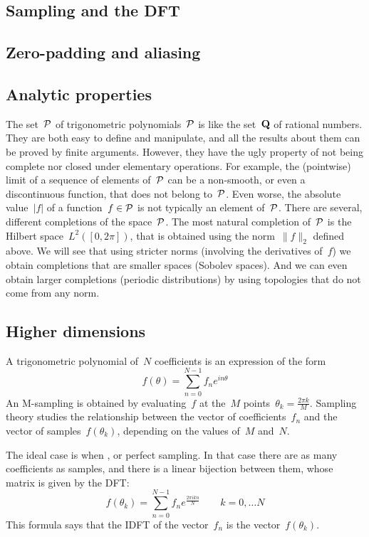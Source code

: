 \subsection{Sampling and the DFT}


\subsection{Zero-padding and aliasing}


\subsection{Analytic properties}

The set~$\mathcal{P}$ of trigonometric polynomials~$\mathcal{P}$ is like the set~$\mathbf{Q}$ of rational
numbers. They are both easy to define and manipulate, and all the results about
them can be proved by finite arguments.  However, they have the ugly property
of not being complete nor closed under elementary operations.  For example, the
(pointwise) limit of a sequence of elements of~$\mathcal{P}$ can be a non-smooth, or
even a discontinuous function, that does not belong to~$\mathcal{P}$.  Even worse, the
absolute value~$|f|$ of a function~$f\in\mathcal{P}$ is not typically an element
of~$\mathcal{P}$.  There are several, different completions of the space~$\mathcal{P}$.  The most
natural completion of~$\mathcal{P}$ is the Hilbert space~$L^2([0,2\pi])$, that is
obtained using the norm~$\|f\|_2$ defined above.  We will see that using
stricter norms (involving the derivatives of~$f$) we obtain completions that
are smaller spaces (Sobolev spaces).  And we can even obtain larger completions
(periodic distributions) by using topologies that do not come from any norm.


\subsection{Higher dimensions}

\clearpage
\thispagestyle{empty}

A trigonometric polynomial of~$N$ coefficients is an expression of the form
\[
	f(\theta)=\sum_{n=0}^{N-1} f_n e^{in\theta}
\]
An M-sampling is obtained by evaluating~$f$ at the~$M$
points~$\theta_k=\frac{2\pi k}{M}$.
Sampling theory studies the relationship between the vector of
coefficients~$f_n$ and the vector of samples~$f(\theta_k)$, depending on the
values of~$M$ and~$N$.

\bigskip

The ideal case is when , or perfect sampling.  In that case there
are as many coefficients as samples, and there is a linear bijection between
them, whose matrix is given by the DFT:
\[
	f(\theta_k)=\sum_{n=0}^{N-1} f_n e^{\frac{2\pi i k n}{N}}
	\qquad
	k=0,\ldots N
\]
This formula says that the IDFT of the vector~$f_n$ is the
vector~$f(\theta_k)$.

